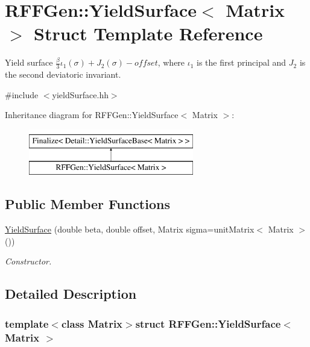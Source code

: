 \hypertarget{structRFFGen_1_1YieldSurface}{\section{R\-F\-F\-Gen\-:\-:Yield\-Surface$<$ Matrix $>$ Struct Template Reference}
\label{structRFFGen_1_1YieldSurface}
}


Yield surface $ \frac{\beta}{3}\iota_1(\sigma) + J_2(\sigma)-offset $, where $\iota_1$ is the first principal and $J_2$ is the second deviatoric invariant.  




{\ttfamily \#include $<$yield\-Surface.\-hh$>$}

Inheritance diagram for R\-F\-F\-Gen\-:\-:Yield\-Surface$<$ Matrix $>$\-:\begin{figure}[H]
\begin{center}
\leavevmode
\includegraphics[height=2.000000cm]{structRFFGen_1_1YieldSurface}
\end{center}
\end{figure}
\subsection*{Public Member Functions}
\begin{DoxyCompactItemize}
\item 
\hyperlink{structRFFGen_1_1YieldSurface_a061091a108035834b402c4f6ad7a1085}{Yield\-Surface} (double beta, double offset, Matrix sigma=unit\-Matrix$<$ Matrix $>$())
\begin{DoxyCompactList}\small\item\em Constructor. \end{DoxyCompactList}\end{DoxyCompactItemize}


\subsection{Detailed Description}
\subsubsection*{template$<$class Matrix$>$struct R\-F\-F\-Gen\-::\-Yield\-Surface$<$ Matrix $>$}

